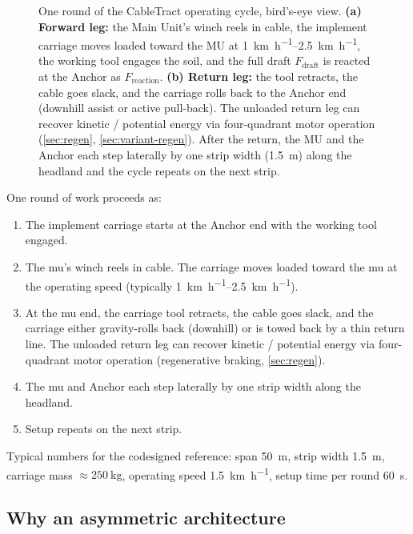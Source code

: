 \documentclass[11pt,a4paper]{article}
\begin{document}
\begin{figure}[H]
\begin{tikzpicture}
\end{tikzpicture}
\caption{One round of the CableTract operating cycle, bird's-eye view. \textbf{(a) Forward leg:} the Main Unit's winch reels in cable, the implement carriage moves loaded toward the MU at \SIrange{1}{2.5}{\kilo\meter\per\hour}, the working tool engages the soil, and the full draft $F_{\text{draft}}$ is reacted at the Anchor as $F_{\text{reaction}}$. \textbf{(b) Return leg:} the tool retracts, the cable goes slack, and the carriage rolls back to the Anchor end (downhill assist or active pull-back). The unloaded return leg can recover kinetic / potential energy via four-quadrant motor operation (\cref{sec:regen}, \cref{sec:variant-regen}). After the return, the MU and the Anchor each step laterally by one strip width (\SI{1.5}{\meter}) along the headland and the cycle repeats on the next strip.}
\label{fig:f0c}
\end{figure}

One round of work proceeds as:

\begin{enumerate}[leftmargin=1.6em,itemsep=0.1em]
    \item The implement carriage starts at the Anchor end with the working tool engaged.
    \item The \gls{mu}'s winch reels in cable. The carriage moves loaded toward the \gls{mu} at the operating speed (typically \SIrange{1}{2.5}{\kilo\meter\per\hour}).
    \item At the \gls{mu} end, the carriage tool retracts, the cable goes slack, and the carriage either gravity-rolls back (downhill) or is towed back by a thin return line. The unloaded return leg can recover kinetic / potential energy via four-quadrant motor operation (regenerative braking, \cref{sec:regen}).
    \item The \gls{mu} and Anchor each step laterally by one strip width along the headland.
    \item Setup repeats on the next strip.
\end{enumerate}

Typical numbers for the codesigned reference: span \SI{50}{\meter}, strip width \SI{1.5}{\meter}, carriage mass ${\approx}\SI{250}{\kilogram}$, operating speed \SI{1.5}{\kilo\meter\per\hour}, setup time per round \SI{60}{\second}.

\subsection{Why an asymmetric architecture}\label{sec:asymmetry}
\end{document}
